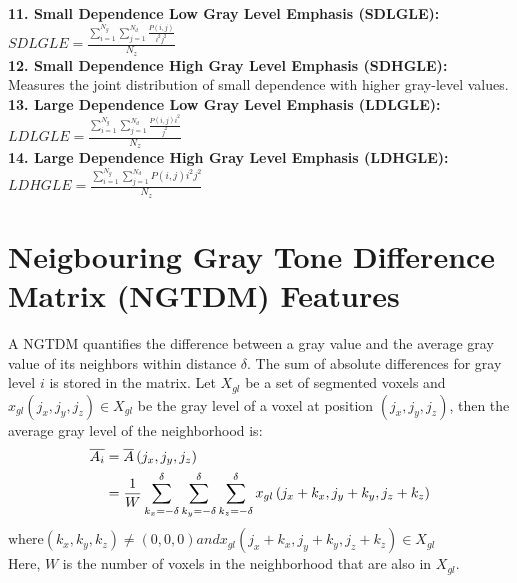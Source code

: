 \textbf{11. Small Dependence Low Gray Level Emphasis (SDLGLE):}\\
$\textit{SDLGLE}=\frac{\sum _{i=1}^{N_{g}}\sum _{j=1}^{N_{d}}\frac{P\left(i,j\right)}{i^{2}j^{2}}}{N_{z}}$\\
\textbf{12. Small Dependence High Gray Level Emphasis (SDHGLE):}\\
Measures the joint distribution of small dependence with higher gray-level values.\\
\textbf{13. Large Dependence Low Gray Level Emphasis (LDLGLE):}\\
$\textit{LDLGLE}=\frac{\sum _{i=1}^{N_{g}}\sum _{j=1}^{N_{d}}\frac{P\left(i,j\right)i^{2}}{j^{2}}}{N_{z}}$\\
\textbf{14. Large Dependence High Gray Level Emphasis (LDHGLE):}\\
$\textit{LDHGLE}=\frac{\sum _{i=1}^{N_{g}}\sum _{j=1}^{N_{d}}P\left(i,j\right)i^{2}j^{2}}{N_{z}}$


\section{Neigbouring Gray Tone Difference Matrix (NGTDM) Features}


A NGTDM quantifies the difference between a gray value and the average gray value of its neighbors within distance $\delta $. The sum of absolute differences for gray level $i$ is stored in the matrix. Let $X_{gl}$ be a set of segmented voxels and $x_{gl}\left(j_{x},j_{y},j_{z}\right)\in X_{gl}$ be the gray level of a voxel at position $\left(j_{x},j_{y},j_{z}\right)$, then the average gray level of the neighborhood is:\\
\begin{align}
\overline{A_{i}} & =\overline{A}\left(j_{x},j_{y},j_{z}\right) \\
& = \frac{1}{W}\sum _{k_{x}=-\delta }^{\delta }\sum _{k_{y}=-\delta }^{\delta }\sum _{k_{z}=-\delta}^{\delta}x_{gl}\left(j_{x}+k_{x},j_{y}+k_{y},j_{z}+k_{z}\right) \\
\end{align}
$\text{where} \left(k_{x},k_{y},k_{z}\right)\neq \left(0,0,0\right) and x_{gl}\left(j_{x}+k_{x},j_{y}+k_{y},j_{z}+k_{z}\right)\in X_{gl}$\\
Here, $W$ is the number of voxels in the neighborhood that are also in $X_{gl}$.\\


